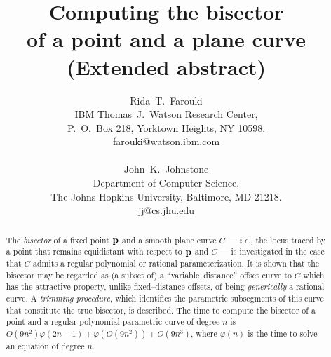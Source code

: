 \newcommand{\figg}[3]{\begin{figure}[htbp]\vspace{#3}\caption{#2}\label{#1}\end{figure}}

\setlength{\oddsidemargin}{0in}
\setlength{\evensidemargin}{0in}
\setlength{\headsep}{0pt}
\setlength{\topmargin}{0in}
\setlength{\textheight}{8.75in}
\setlength{\textwidth}{6.5in}

\title{
Computing the bisector \\
of a point and a plane curve \\
(Extended abstract)
}

\author{
Rida~T.~Farouki \\
IBM Thomas~J.~Watson Research Center, \\
P.~O.~Box 218, Yorktown Heights, NY 10598. \\
farouki@watson.ibm.com \\ \\
John~K.~Johnstone \\
Department of Computer Science, \\
The Johns Hopkins University, Baltimore, MD 21218. \\
jj@cs.jhu.edu
}

\date{}

\maketitle

\begin{abstract}
The {\it bisector\/} of a fixed point ${\bf p}$ and a smooth
plane curve $C$ --- {\it i.e.}, the locus traced by a point
that remains equidistant with respect to ${\bf p}$ and $C$ ---
is investigated in the case that $C$ admits a regular polynomial
or rational parameterization. It is shown that the bisector may be
regarded as (a subset of) a ``variable--distance'' offset curve to
$C$ which has the attractive property, unlike fixed--distance offsets,
of being {\it generically\/} a rational curve. 
A {\it trimming procedure}, which identifies the parametric subsegments
of this curve that constitute the true bisector, is described.
The time to compute the bisector of a point and a regular polynomial
parametric curve of degree $n$ is 
$O(9n^{2}) \varphi(2n-1) + \varphi(O(9n^2)) + O(9n^3)$, where 
$\varphi(n)$ is the time to solve an equation of degree $n$.
\end{abstract}


